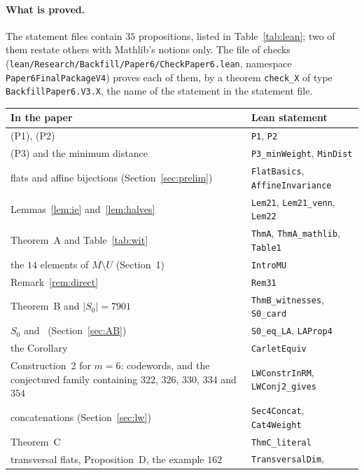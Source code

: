 \documentclass[11pt]{article}
\theoremstyle{remark}
\begin{document}
\paragraph{What is proved.}
The statement files contain $35$ propositions, listed in Table~\ref{tab:lean};
two of them restate others with Mathlib's notions only. The file of checks
(\texttt{lean/\allowbreak Research/\allowbreak Backfill/\allowbreak Paper6/\allowbreak CheckPaper6.lean},
namespace \texttt{Paper6FinalPackageV4}) proves each of them, by a theorem
\texttt{check\_X} of type \texttt{BackfillPaper6.V3.X}, the name of the
statement in the statement file.

\begin{table}[ht]\centering\small
\begin{tabular}{@{}>{\raggedright\arraybackslash}p{}
 >{\raggedright\arraybackslash}p{}@{}}\toprule
In the paper & Lean statement\\\midrule
(P1), (P2) & \texttt{P1}, \texttt{P2}\\
(P3) and the minimum distance & \texttt{P3\_minWeight}, \texttt{MinDist}\\
flats and affine bijections (Section~\ref{sec:prelim}) & \texttt{FlatBasics},
 \texttt{AffineInvariance}\\
Lemmas~\ref{lem:ie} and~\ref{lem:halves} & \texttt{Lem21}, \texttt{Lem21\_venn},
 \texttt{Lem22}\\
Theorem~A and Table~\ref{tab:wit} & \texttt{ThmA}, \texttt{ThmA\_mathlib},
 \texttt{Table1}\\
the $14$ elements of $M\setminus U$ (Section~1) & \texttt{IntroMU}\\
Remark~\ref{rem:direct} & \texttt{Rem31}\\
Theorem~B and $|S_0|=7901$ & \texttt{ThmB\_witnesses}, \texttt{S0\_card}\\
$S_0$ and~\cite[Proposition~4]{la} (Section~\ref{sec:AB}) & \texttt{S0\_eq\_LA},
 \texttt{LAProp4}\\
the Corollary & \texttt{CarletEquiv}\\
Construction~2 for $m=6$: codewords, and the conjectured family containing
 $322$, $326$, $330$, $334$ and $354$ &
 \texttt{LWConstrInRM}, \texttt{LWConj2\_gives}\\
concatenations (Section~\ref{sec:lw}) & \texttt{Sec4Concat}, \texttt{Cat4Weight}\\
Theorem~C & \texttt{ThmC\_literal}\\
transversal flats, Proposition~D, the example $162$ & \texttt{TransversalDim},

\end{tabular}
\end{table}
\end{document}
